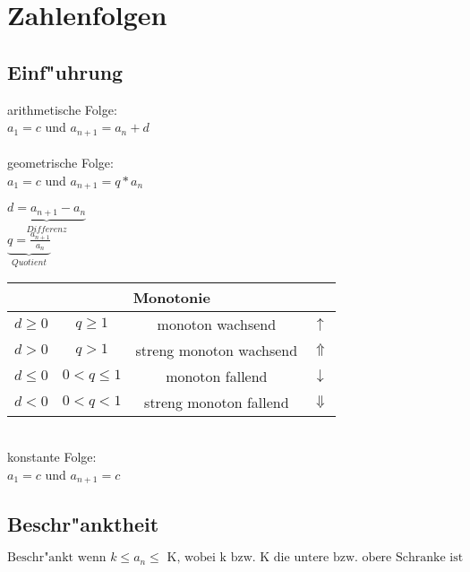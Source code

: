 \section{Zahlenfolgen}
\subsection{Einf"uhrung}

\begin{minipage}[c]{5cm}
	arithmetische Folge: \\
	$a_1=c$ und $a_{n+1}=a_n+d$ \\
	\\
	geometrische Folge:\\
	$a_1=c$ und $a_{n+1}=q*a_n$\\
\end{minipage}
\begin{minipage}[c]{2.5cm}
	$ $\\
	$\underbrace{d=a_{n+1}-a_n}_{Differenz}$\\
	$ $\\
	$\underbrace{q=\frac{a_{n+1}}{a_n}}_{Quotient}$
\end{minipage}
\begin{minipage}[c]{10cm}	
	\begin{tabular}{|c|c|c|c|}
		\hline
		\multicolumn{4}{|c|}{Monotonie} \\
		\hline
		$d \geq 0$ & $q \geq 1$ & monoton wachsend & $\uparrow$\\
		\hline
		$d > 0$ & $q > 1$ & streng monoton wachsend & $\Uparrow$\\
		\hline
		$d \leq 0$  & $0 < q \leq 1$ & monoton fallend & $\downarrow$\\
		\hline
		$d < 0$ & $0 < q < 1$ & streng monoton fallend & $\Downarrow$\\
		\hline
	\end{tabular}
\end{minipage}
	\\
	konstante Folge:\\
	$a_1=c$ und $a_{n+1}=c$

\subsection{Beschr"anktheit}
	$\text{Beschr"ankt wenn }k\leq a_n\leq\text{ K,	wobei k bzw. K die untere bzw. obere Schranke
	ist}$
